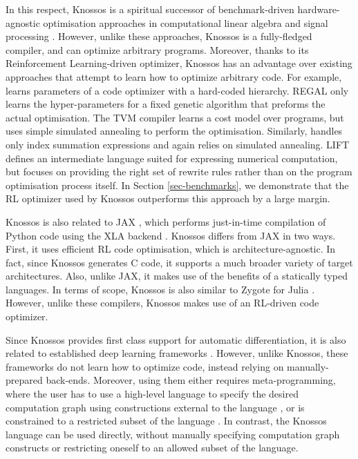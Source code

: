 \documentclass[fullpage,twocolumn]{article} %
\def\Cpp{{C\nolinebreak[4]\hspace{-.05em}\raisebox{.4ex}{\tiny\bf ++}} }
\begin{document}
In this respect, Knossos is a spiritual successor of benchmark-driven hardware-agnostic optimisation approaches in computational linear algebra \citep{paduaAutomaticallyTunedLinear2011} and signal processing \citep{frigoFFTWAdaptiveSoftware1998}. However, unlike these approaches, Knossos is a fully-fledged compiler, and can optimize arbitrary programs. Moreover, thanks to its Reinforcement Learning-driven optimizer, Knossos has an advantage over existing approaches that attempt to learn how to optimize arbitrary code. For example, \citet{bunelLearningSuperoptimizePrograms2017} learns parameters of a code optimizer with a hard-coded hierarchy. REGAL \citep{paliwalREGALTransferLearning2019} only learns the hyper-parameters for a fixed genetic algorithm that preforms the actual optimisation.  The TVM compiler \citep{chenTVMAutomatedEndtoEnd2018} learns a cost model over programs, but uses simple simulated annealing to perform the optimisation. Similarly, \citet{chenLearningOptimizeTensor2018} handles only index summation expressions and again relies on simulated annealing. LIFT \citep{lift-paper} defines an intermediate language suited for expressing numerical computation, but focuses on providing the right set of rewrite rules rather than on the program optimisation process itself. In Section \ref{sec-benchmarks}, we demonstrate that the RL optimizer used by Knossos outperforms this approach by a large margin.

Knossos is also related to JAX \citep{jax}, which performs just-in-time compilation of Python code using the XLA backend \citep{xlaauthorsTensorFlowXLAAccelerated2016}. Knossos differs from JAX in two ways. First, it uses efficient RL code optimisation, which is architecture-agnostic. In fact, since Knossos generates \Cpp code, it supports a much broader variety of target architectures. Also, unlike JAX, it makes use of the benefits of a statically typed languages. In terms of scope, Knossos is also similar to Zygote for Julia \citep{innes2019zygote}. However, unlike these compilers, Knossos makes use of an RL-driven code optimizer.

Since Knossos provides first class support for automatic differentiation, it is also related to established deep learning frameworks \citep{maclaurinAutogradEffortlessGradients2015, abadiTensorFlowSystemLargeScale2016, paszkeAutomaticDifferentiationPyTorch2017a}. However, unlike Knossos, these frameworks do not learn how to optimize code, instead relying on manually-prepared back-ends. Moreover, using them either requires meta-programming, where the user  has to use a high-level language to specify the desired computation graph using constructions external to the language \citep{abadiTensorFlowSystemLargeScale2016}, or is constrained to a restricted subset of the language \citep{paszkeAutomaticDifferentiationPyTorch2017a}. In contrast, the Knossos language can be used directly, without manually specifying  computation graph constructs or restricting oneself to an allowed subset of the language. 
\end{document}
